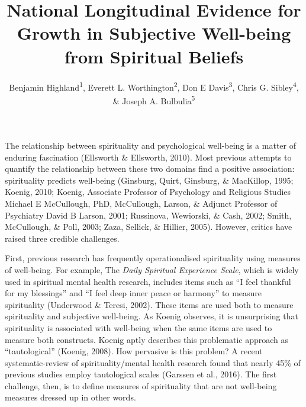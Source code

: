 \documentclass[
  english,
  man,floatsintext]{apa6}
\title{National Longitudinal Evidence for Growth in Subjective Well-being from Spiritual Beliefs}
\author{Benjamin Highland\textsuperscript{1}, Everett L. Worthington\textsuperscript{2}, Don E Davis\textsuperscript{3}, Chris G. Sibley\textsuperscript{4}, \& Joseph A. Bulbulia\textsuperscript{5}}
\date{}
\affiliation{\phantom{0}}
\begin{document}
\maketitle

The relationship between spirituality and psychological well-being is a matter of enduring fascination (Ellsworth \& Ellsworth, 2010). Most previous attempts to quantify the relationship between these two domains find a positive association: spirituality predicts well-being (Ginsburg, Quirt, Ginsburg, \& MacKillop, 1995; Koenig, 2010; Koenig, Associate Professor of Psychology and Religious Studies Michael E McCullough, PhD, McCullough, Larson, \& Adjunct Professor of Psychiatry David B Larson, 2001; Russinova, Wewiorski, \& Cash, 2002; Smith, McCullough, \& Poll, 2003; Zaza, Sellick, \& Hillier, 2005). However, critics have raised three credible challenges.

First, previous research has frequently operationalised spirituality using measures of well-being. For example, The \emph{Daily Spiritual Experience Scale}, which is widely used in spiritual mental health research, includes items such as \enquote{I feel thankful for my blessings} and \enquote{I feel deep inner peace or harmony} to measure spirituality (Underwood \& Teresi, 2002). These items are used both to measure spirituality and subjective well-being. As Koenig observes, it is unsurprising that spirituality is associated with well-being when the same items are used to measure both constructs. Koenig aptly describes this problematic approach as \enquote{tautological} (Koenig, 2008). How pervasive is this problem? A recent systematic-review of spirituality/mental health research found that nearly 45\% of previous studies employ tautological scales (Garssen et al., 2016). The first challenge, then, is to define measures of spirituality that are not well-being measures dressed up in other words.
\end{document}
